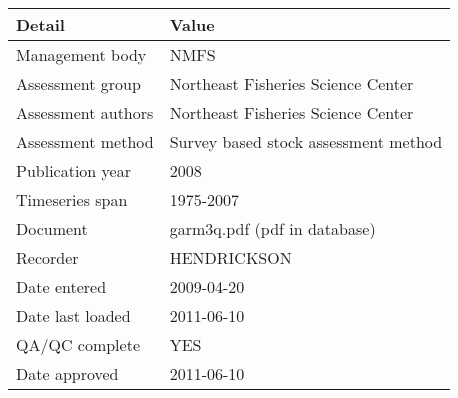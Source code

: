 \begin{table}[htb]
\centering
\begin{tabular}{lp{7cm}}
\toprule
Detail & Value \\
\midrule
Management body    & NMFS                                 \\
Assessment group   & Northeast Fisheries Science Center   \\
Assessment authors & Northeast Fisheries Science Center   \\
Assessment method  & Survey based stock assessment method \\
Publication year   & 2008                                 \\
Timeseries span    & 1975-2007                            \\
Document           & garm3q.pdf (pdf in database)         \\
Recorder           & HENDRICKSON                          \\
Date entered       & 2009-04-20                           \\
Date last loaded   & 2011-06-10                           \\
QA/QC complete     & YES                                  \\
Date approved      & 2011-06-10                           \\
\bottomrule
\end{tabular}
\label{tab:assessdet}
\end{table}
